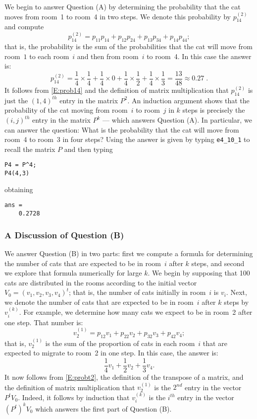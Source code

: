 \documentclass{ximera}
\begin{document}
We begin to answer Question (A) by determining the probability that the
cat moves from room~1 to room~4 in two steps.  We denote this probability
by $p_{14}^{(2)}$ and compute
\begin{equation} \label{E:prob14}
p_{14}^{(2)} = p_{11}p_{14} + p_{12}p_{24} + p_{13}p_{34} + p_{14}p_{44};
\end{equation}
that is, the probability is the sum of the probabilities that the cat will
move from room~$1$ to each room~$i$ and then from room~$i$ to room~4.  In
this case the answer is:
\[
p_{14}^{(2)} = \frac{1}{4}\times\frac{1}{4} + \frac{1}{4}\times0 +
\frac{1}{4}\times\frac{1}{2} + \frac{1}{4}\times\frac{1}{3} =
\frac{13}{48} \approx 0.27\;.
\]
It follows from \eqref{E:prob14} and the definition of matrix multiplication
that $p_{14}^{(2)}$ is just the $(1,4)^{th}$ entry in the matrix $P^2$.  An
induction argument shows that the probability of the cat moving from
room~$i$ to room~$j$ in $k$ steps is precisely the $(i,j)^{th}$ entry in the
matrix $P^k$ --- which answers Question (A).  In particular, we can answer the
question: What is the probability that the cat will move from room~4 to room~3
in four steps?  Using \Matlab the answer is given by typing {\tt e4\_10\_1} to
recall the matrix $P$ and then typing
\begin{verbatim}
P4 = P^4;
P4(4,3)
\end{verbatim}
obtaining
\begin{verbatim}
ans =
    0.2728
\end{verbatim}

\subsubsection*{A Discussion of Question (B)}

We answer Question (B) in two parts: first we compute a formula for
determining the number of cats that are expected to be in room~$i$ after $k$
steps, and second we explore that formula numerically for large $k$.  We
begin by supposing that 100 cats are distributed in the rooms according to
the initial vector $V_0=(v_1,v_2,v_3,v_4)^t$; that is, the number of cats
initially in room~$i$ is $v_i$.  Next, we denote the number of cats that are
expected to be in room~$i$ after $k$ steps by $v_i^{(k)}$.  For example, we
determine how many cats we expect to be in room~2 after one step.  That
number is:
\begin{equation} \label{E:probt2}
v_2^{(1)}=p_{12}v_1 + p_{22}v_2 + p_{32}v_3 + p_{42}v_4;
\end{equation}
that is, $v_2^{(1)}$ is the sum of the proportion of cats in each room~$i$
that are expected to migrate to room~2 in one step.  In this case, the answer
is:
\[
\frac{1}{4}v_1 + \frac{1}{2}v_2 + \frac{1}{3}v_4.
\]
It now follows from \eqref{E:probt2}, the definition of the transpose of a
matrix, and the definition of matrix multiplication that $v_2^{(1)}$ is
the $2^{nd}$ entry in the vector $P^tV_0$.  Indeed, it follows by induction
that $v_i^{(k)}$ is the $i^{th}$ entry in the vector $(P^t)^kV_0$ which
answers the first part of Question (B).
\end{document}
